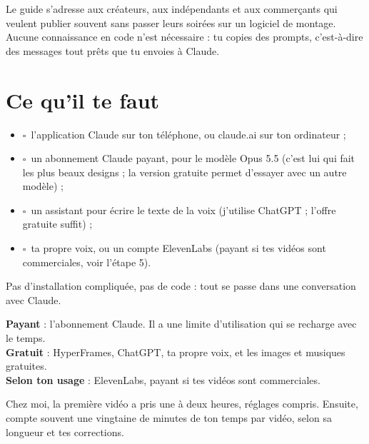 \documentclass[11pt,oneside,openany]{book}
\newcommand{\coche}{$\square$\ }
\begin{document}
Le guide s'adresse aux créateurs, aux indépendants et aux commerçants qui veulent publier souvent sans passer leurs soirées sur un logiciel de montage. Aucune connaissance en code n'est nécessaire : tu copies des prompts, c'est-à-dire des messages tout prêts que tu envoies à Claude.

\section*{Ce qu'il te faut}
\begin{itemize}[label={}]
  \item \coche l'application Claude sur ton téléphone, ou claude.ai sur ton ordinateur ;
  \item \coche un abonnement Claude payant, pour le modèle Opus 5.5 (c'est lui qui fait les plus beaux designs ; la version gratuite permet d'essayer avec un autre modèle) ;
  \item \coche un assistant pour écrire le texte de la voix (j'utilise ChatGPT ; l'offre gratuite suffit) ;
  \item \coche ta propre voix, ou un compte ElevenLabs (payant si tes vidéos sont commerciales, voir l'étape 5).
\end{itemize}
Pas d'installation compliquée, pas de code : tout se passe dans une conversation avec Claude.

\begin{tcolorbox}[enhanced,colback=fondgris,colframe=encre!25,boxrule=0.6pt,arc=3pt,left=7pt,right=7pt,top=3pt,bottom=3pt,fontupper=\small,title={Le budget},fonttitle=\bfseries\small,coltitle=white,colbacktitle=encre]
\textbf{Payant} : l'abonnement Claude. Il a une limite d'utilisation qui se recharge avec le temps.\\
\textbf{Gratuit} : HyperFrames, ChatGPT, ta propre voix, et les images et musiques gratuites.\\
\textbf{Selon ton usage} : ElevenLabs, payant si tes vidéos sont commerciales.
\end{tcolorbox}

Chez moi, la première vidéo a pris une à deux heures, réglages compris. Ensuite, compte souvent une vingtaine de minutes de ton temps par vidéo, selon sa longueur et tes corrections.
\end{document}
